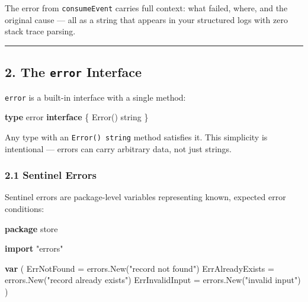 \documentclass[
]{article}
\newenvironment{Shaded}{}{}
\newcommand{\DataTypeTok}[1]{\textcolor[rgb]{0.56,0.13,0.00}{#1}}
\newcommand{\KeywordTok}[1]{\textcolor[rgb]{0.00,0.44,0.13}{\textbf{#1}}}
\newcommand{\NormalTok}[1]{#1}
\newcommand{\OperatorTok}[1]{\textcolor[rgb]{0.40,0.40,0.40}{#1}}
\newcommand{\StringTok}[1]{\textcolor[rgb]{0.25,0.44,0.63}{#1}}
\begin{document}
The error from \texttt{consumeEvent} carries full context: what failed,
where, and the original cause --- all as a string that appears in your
structured logs with zero stack trace parsing.

\begin{center}\rule{0.5\linewidth}{0.5pt}\end{center}

\hypertarget{the-error-interface}{%
\subsection{\texorpdfstring{2. The \texttt{error}
Interface}{2. The error Interface}}\label{the-error-interface}}

\texttt{error} is a built-in interface with a single method:

\begin{Shaded}
\begin{Highlighting}[]
\KeywordTok{type} \DataTypeTok{error} \KeywordTok{interface} \OperatorTok{\{}
\NormalTok{    Error}\OperatorTok{()} \DataTypeTok{string}
\OperatorTok{\}}
\end{Highlighting}
\end{Shaded}

Any type with an \texttt{Error()\ string} method satisfies it. This
simplicity is intentional --- errors can carry arbitrary data, not just
strings.

\hypertarget{sentinel-errors}{%
\subsubsection{2.1 Sentinel Errors}\label{sentinel-errors}}

Sentinel errors are package-level variables representing known, expected
error conditions:

\begin{Shaded}
\begin{Highlighting}[]
\KeywordTok{package}\NormalTok{ store}

\KeywordTok{import} \StringTok{"errors"}

\KeywordTok{var} \OperatorTok{(}
\NormalTok{    ErrNotFound      }\OperatorTok{=}\NormalTok{ errors}\OperatorTok{.}\NormalTok{New}\OperatorTok{(}\StringTok{"record not found"}\OperatorTok{)}
\NormalTok{    ErrAlreadyExists }\OperatorTok{=}\NormalTok{ errors}\OperatorTok{.}\NormalTok{New}\OperatorTok{(}\StringTok{"record already exists"}\OperatorTok{)}
\NormalTok{    ErrInvalidInput  }\OperatorTok{=}\NormalTok{ errors}\OperatorTok{.}\NormalTok{New}\OperatorTok{(}\StringTok{"invalid input"}\OperatorTok{)}
\OperatorTok{)}
\end{Highlighting}
\end{Shaded}
\end{document}

